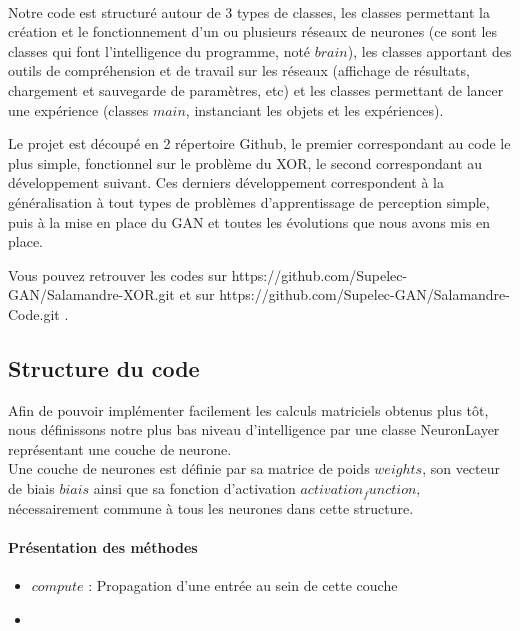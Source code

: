 \paragraph*{} %
Notre code est structuré autour de 3 types de classes, les classes permettant la création et le fonctionnement d'un ou plusieurs réseaux de neurones (ce sont les classes qui font l'intelligence du programme, noté $brain$), les classes apportant des outils de compréhension et de travail sur les réseaux (affichage de résultats, chargement et sauvegarde de paramètres, etc) et les classes permettant de lancer une expérience (classes $main$, instanciant les objets et les expériences).

Le projet est découpé en 2 répertoire Github, le premier correspondant au code le plus simple, fonctionnel sur le problème du XOR, le second correspondant au développement suivant. Ces derniers développement correspondent à la généralisation à tout types de problèmes d'apprentissage de perception simple, puis à la mise en place du GAN et toutes les évolutions que nous avons mis en place.

Vous pouvez retrouver les codes sur https://github.com/Supelec-GAN/Salamandre-XOR.git et sur https://github.com/Supelec-GAN/Salamandre-Code.git .

\subsection{Structure du code} %
\label{sub:structure_du_code}

Afin de pouvoir implémenter facilement les calculs matriciels obtenus plus tôt, nous définissons notre plus bas niveau d'intelligence par une classe NeuronLayer représentant une couche de neurone. \\

Une couche de neurones est définie par sa matrice de poids $weights$, son vecteur de biais $biais$ ainsi que sa fonction d'activation $activation_function$, nécessairement commune à tous les neurones dans cette structure.

\paragraph{Présentation des méthodes} %
 \label{par:presentatation_des_methodes}
 
 \begin{itemize}
 	\item $compute$ : Propagation d'une entrée au sein de cette couche
 	\item 
 \end{itemize}

